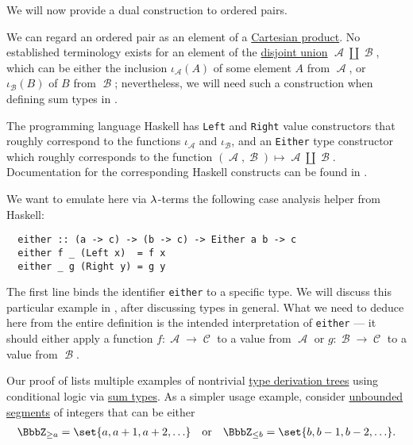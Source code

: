 \begin{example}
\begin{thmenum}
     We will now provide a dual construction to ordered pairs.

    We can regard an ordered pair as an element of a \hyperref[def:cartesian_product]{Cartesian product}. No established terminology exists for an element of the \hyperref[def:disjoint_union]{disjoint union} \( \mscrA \amalg \mscrB \), which can be either the inclusion \( \iota_\mscrA(A) \) of some element \( A \) from \( \mscrA \), or \( \iota_\mscrB(B) \) of \( B \) from \( \mscrB \); nevertheless, we will need such a construction when defining sum types in .

    The programming language Haskell has \verb|Left| and \verb|Right| value constructors that roughly correspond to the functions \( \iota_\mscrA \) and \( \iota_\mscrB \), and an \verb|Either| type constructor which roughly corresponds to the function \( (\mscrA, \mscrB) \mapsto \mscrA \amalg \mscrB \). Documentation for the corresponding Haskell constructs can be found in \cite{HackageDocs:base-4.21:either}.

    We want to emulate here via \( {\mathrm \lambda} \)-terms the following case analysis helper from Haskell:
    \begin{verbatim}
  either :: (a -> c) -> (b -> c) -> Either a b -> c
  either f _ (Left x)  = f x
  either _ g (Right y) = g y
    \end{verbatim}\vspace{-\baselineskip}

    The first line binds the identifier \verb|either| to a specific type. We will discuss this particular example in , after discussing types in general. What we need to deduce here from the entire definition is the intended interpretation of \verb|either| --- it should either apply a function \( f: \mscrA \to \mscrC \) to a value from \( \mscrA \) or \( g: \mscrB \to \mscrC \) to a value from \( \mscrB \).

    Our proof of  lists multiple examples of nontrivial \hyperref[def:type_derivation_tree]{type derivation trees} using conditional logic via \hyperref[def:simple_sum_type]{sum types}. As a simpler usage example, consider \hyperref[def:order_interval/unbounded]{unbounded segments} of integers that can be either
    \begin{align*}
      \BbbZ_{\geq a} = \set{ a, a + 1, a + 2, \ldots }
      &&\T{or}&&
      \BbbZ_{\leq b} = \set{ b, b - 1, b - 2, \ldots }.
    \end{align*}


\end{thmenum}
\end{example}
